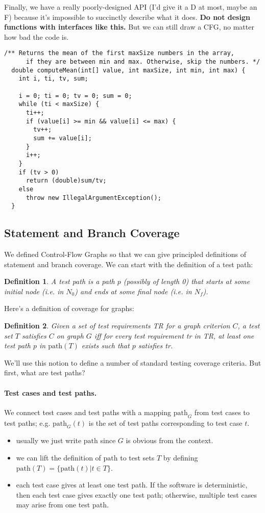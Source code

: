\documentclass[11pt]{article}
\newtheorem{defn}{Definition}
\begin{document}
\newpage
Finally, we have a really poorly-designed API (I'd give it a D at most,
maybe an F) because it's impossible to succinctly describe what it
does. {\bf Do not design functions with interfaces like this.} But we
can still draw a CFG, no matter how bad the code is.
\begin{lstlisting}[basicstyle=\scriptsize\ttfamily]
  /** Returns the mean of the first maxSize numbers in the array,
      if they are between min and max. Otherwise, skip the numbers. */
  double computeMean(int[] value, int maxSize, int min, int max) {
    int i, ti, tv, sum;

    i = 0; ti = 0; tv = 0; sum = 0;
    while (ti < maxSize) {
      ti++;
      if (value[i] >= min && value[i] <= max) {
        tv++;
        sum += value[i];
      }
      i++;
    }
    if (tv > 0)
      return (double)sum/tv;
    else
      throw new IllegalArgumentException();
  }
\end{lstlisting}

\subsection*{Statement and Branch Coverage}
We defined Control-Flow Graphs so that we can give principled definitions of
statement and branch coverage. We can start with the definition of a test path:

\begin{defn} A \emph{test path} is a path $p$ (possibly of length 0)
that starts at some initial node (i.e. in $N_0$) and ends at some final node (i.e. in $N_f$).
\end{defn}

Here's a definition of coverage for graphs:
\begin{defn}
Given a set of test requirements \emph{TR} for a graph criterion $C$, 
a test set $T$ satisfies $C$ on graph $G$ iff for every test requirement
\emph{tr} in \emph{TR}, at least one test path $p$ in $\mbox{path}(T)$ 
exists such that $p$ satisfies \emph{tr}.
\end{defn}
We'll use this notion to define a number of standard testing
coverage criteria. But first, what are test paths?

\paragraph{Test cases and test paths.} We connect test cases and
test paths with a mapping $\mbox{path}_G$ from test cases to test
paths; e.g. $\mbox{path}_G(t)$ is the set of test paths corresponding
to test case $t$.
\begin{itemize}
\item usually we just write $\mbox{path}$ since $G$ is obvious from the context.
\item we can lift the definition of $\mbox{path}$ to test sets $T$ by defining
$\mbox{path}(T) = \{ \mbox{path}(t) | t \in T \}$.
\item each test case gives at least one test path. If the software is
  deterministic, then each test case gives exactly one test path;
  otherwise, multiple test cases may arise from one test path.
\end{itemize}
\end{document}

